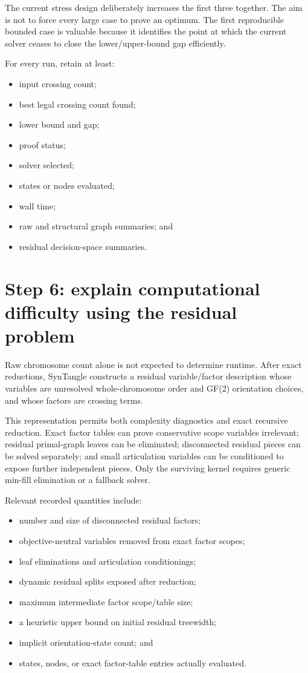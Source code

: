 \documentclass[11pt]{article}
\begin{document}
The current stress design deliberately increases the first three together.
The aim is not to force every large case to prove an optimum.  The first
reproducible bounded case is valuable because it identifies the point at which
the current solver ceases to close the lower/upper-bound gap efficiently.

For every run, retain at least:

\begin{itemize}
  \item input crossing count;
  \item best legal crossing count found;
  \item lower bound and gap;
  \item proof status;
  \item solver selected;
  \item states or nodes evaluated;
  \item wall time;
  \item raw and structural graph summaries; and
  \item residual decision-space summaries.
\end{itemize}

\section{Step 6: explain computational difficulty using the residual problem}

Raw chromosome count alone is not expected to determine runtime.  After exact
reductions, SynTangle constructs a residual variable/factor description whose
variables are unresolved whole-chromosome order and GF(2) orientation choices,
and whose factors are crossing terms.

This representation permits both complexity diagnostics and exact recursive
reduction.  Exact factor tables can prove conservative scope variables
irrelevant; residual primal-graph leaves can be eliminated; disconnected residual pieces
can be solved separately; and small articulation variables can be conditioned
to expose further independent pieces.  Only the surviving kernel requires
generic min-fill elimination or a fallback solver.

Relevant recorded quantities include:

\begin{itemize}
  \item number and size of disconnected residual factors;
  \item objective-neutral variables removed from exact factor scopes;
  \item leaf eliminations and articulation conditionings;
  \item dynamic residual splits exposed after reduction;
  \item maximum intermediate factor scope/table size;
  \item a heuristic upper bound on initial residual treewidth;
  \item implicit orientation-state count; and
  \item states, nodes, or exact factor-table entries actually evaluated.
\end{itemize}
\end{document}
